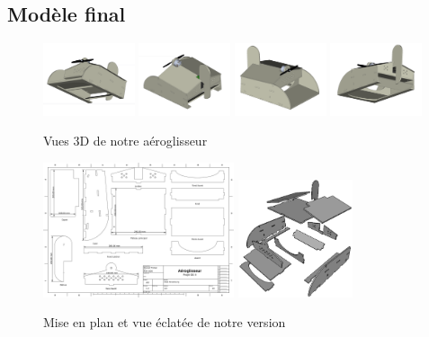 			\subsection{Modèle final}
			\begin{figure}[h]
					\includegraphics[width=0.24\textwidth]{../Illus/vuedessous}
					\includegraphics[width=0.24\textwidth]{../Illus/vuedessusa}
					\includegraphics[width=0.24\textwidth]{../Illus/vuedessus}
					\includegraphics[width=0.24\textwidth]{../Illus/vuedessousa}
					\caption{Vues 3D de notre aéroglisseur}
					\label{vues}
				\end{figure}
				\begin{figure}
					\begin{center}
						 \includegraphics[width=0.5\textwidth]{../Illus/MiseEnPlanModif}
						 \includegraphics[width=0.3\textwidth]{../Illus/eclate}
					\end{center}
					\caption{Mise en plan et vue éclatée de notre version}
					\label{MEP}
				\end{figure}
